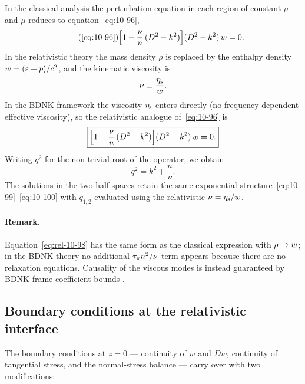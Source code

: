 In the classical analysis the perturbation equation in each region of
constant $\rho$ and $\mu$ reduces to equation~\eqref{eq:10-96},
\begin{equation}\tag{\ref{eq:10-96}}
  \Bigl[1 - \frac{\nu}{n}\,(D^{2}-k^{2})\Bigr](D^{2}-k^{2})\,w = 0.
\end{equation}
In the relativistic theory the mass density $\rho$ is replaced by
the enthalpy density $w = (\varepsilon+p)/c^{2}$, and the
kinematic viscosity is
\begin{equation}\label{eq:rel-10-nu}
  \nu \equiv \frac{\eta_{\mathrm{s}}}{w}.
\end{equation}
In the BDNK framework the viscosity $\eta_{\mathrm{s}}$ enters directly
(no frequency-dependent effective viscosity), so the relativistic
analogue of~\eqref{eq:10-96} is
\begin{equation}\label{eq:rel-10-96}
  \boxed{
  \Bigl[1 - \frac{\nu}{n}\,(D^{2}-k^{2})\Bigr]
  (D^{2}-k^{2})\,w = 0.
  }
\end{equation}
Writing $q^{2}$ for the non-trivial root of the operator, we
obtain
\begin{equation}\label{eq:rel-10-98}
  q^{2}
  = k^{2} + \frac{n}{\nu}.
\end{equation}
The solutions in the two half-spaces retain the same exponential
structure~\eqref{eq:10-99}--\eqref{eq:10-100} with $q_{1,2}$
evaluated using the relativistic $\nu = \eta_{\mathrm{s}}/w$.

\paragraph{Remark.}
Equation~\eqref{eq:rel-10-98} has the same form as the classical
expression with $\rho \to w$; in the BDNK theory no
additional $\tau_{\pi} n^2/\nu$ term appears because there are no
relaxation equations.  Causality of the viscous modes is instead
guaranteed by BDNK frame-coefficient bounds
\citep{BemficaDN2018,Kovtun2019}.

\subsection{Boundary conditions at the relativistic interface}
\label{sec:rel-10-94-BC}

The boundary conditions at $z = 0$ --- continuity of $w$ and $Dw$,
continuity of tangential stress, and the normal-stress balance ---
carry over with two modifications:

